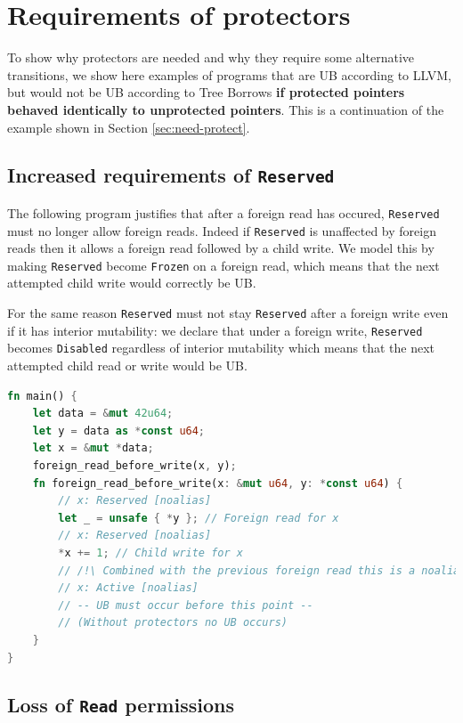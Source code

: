 \documentclass[a4paper,11pt]{article}
\theoremstyle{plain}
\theoremstyle{definition}
\theoremstyle{remark}
\newcommand{\tperm}[1]{\texttt{#1}}
\begin{document}
\newpage
\section{Requirements of protectors}
\label{app:need-protect}

To show why protectors are needed and why they require some alternative
transitions, we show here examples of programs that are UB according to LLVM,
but would not be UB according to Tree Borrows \textbf{if protected pointers behaved identically to unprotected pointers}.
This is a continuation of the example shown in Section \ref{sec:need-protect}.

\subsection{Increased requirements of \tperm{Reserved}}

The following program justifies that after a foreign read has occured, \tperm{Reserved} must no longer allow
foreign reads. Indeed if \tperm{Reserved} is unaffected by foreign reads then it allows a foreign read
followed by a child write. We model this by making \tperm{Reserved} become \tperm{Frozen} on a foreign read,
which means that the next attempted child write would correctly be UB.

For the same reason \tperm{Reserved} must not stay \tperm{Reserved} after a foreign write even
if it has interior mutability: we declare that under a foreign write, \tperm{Reserved} becomes
\tperm{Disabled} regardless of interior mutability which means that the next attempted child read or write would be UB.

\begin{lstlisting}[language=rust]
fn main() {
    let data = &mut 42u64;
    let y = data as *const u64;
    let x = &mut *data;
    foreign_read_before_write(x, y);
    fn foreign_read_before_write(x: &mut u64, y: *const u64) {
        // x: Reserved [noalias]
        let _ = unsafe { *y }; // Foreign read for x
        // x: Reserved [noalias]
        *x += 1; // Child write for x
        // /!\ Combined with the previous foreign read this is a noalias violation
        // x: Active [noalias]
        // -- UB must occur before this point --
        // (Without protectors no UB occurs)
    }
}
\end{lstlisting}


\subsection{Loss of \tperm{Read} permissions}
\end{document}
